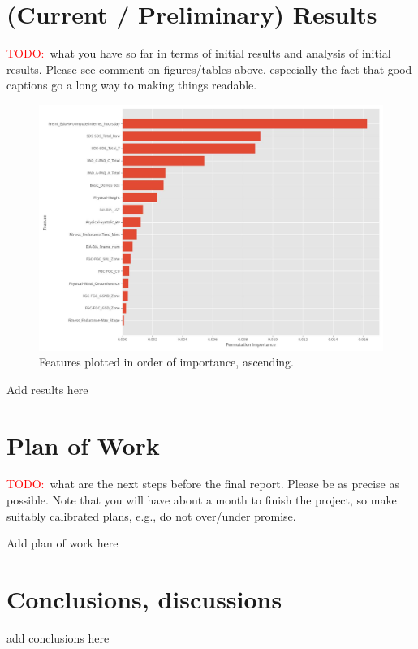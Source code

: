 \documentclass[11pt]{extarticle}
\newcommand{\todo}{\textcolor{red}{TODO:}~}
\begin{document}
\section{(Current / Preliminary) Results} 
\todo what you have so far in terms of initial results and analysis of initial results. Please see comment on figures/tables above, especially the fact that good captions go a long way to making things readable.

\begin{figure}[h]
    \centering
    \includegraphics[scale=0.4]{"./feature_importance.jpg"}
    \caption{Features plotted in order of importance, ascending.}
\end{figure}

\begin{mdframed}
    Add results here
\end{mdframed}

\section{Plan of Work} 
\todo what are the next steps before the final report. Please be as precise as possible. Note that you will have about a month to finish the project, so make suitably calibrated plans, e.g., do not over/under promise.

\begin{mdframed}
    Add plan of work here
\end{mdframed}

\section{Conclusions, discussions}

\begin{mdframed}
    add conclusions here
\end{mdframed}



\end{document}
